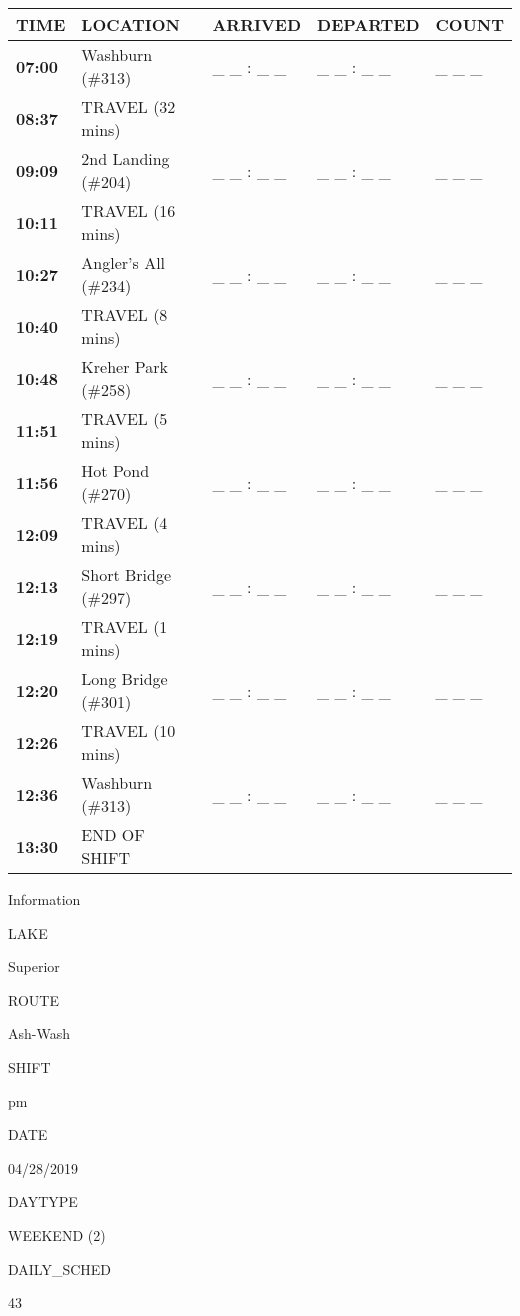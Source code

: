 \documentclass[]{article}
\begin{document}
\begin{tabular}{>{\bfseries}lllll}
\toprule
\textbf{TIME} & \textbf{LOCATION} & \textbf{ARRIVED} & \textbf{DEPARTED} & \textbf{COUNT}\\
\midrule
07:00 & Washburn (\#313) & \_ \_ : \_ \_ & \_ \_ : \_ \_ & \_ \_ \_\\
08:37 & TRAVEL (32 mins) &  &  & \\
09:09 & 2nd Landing (\#204) & \_ \_ : \_ \_ & \_ \_ : \_ \_ & \_ \_ \_\\
10:11 & TRAVEL (16 mins) &  &  & \\
10:27 & Angler's All (\#234) & \_ \_ : \_ \_ & \_ \_ : \_ \_ & \_ \_ \_\\
10:40 & TRAVEL (8 mins) &  &  & \\
10:48 & Kreher Park (\#258) & \_ \_ : \_ \_ & \_ \_ : \_ \_ & \_ \_ \_\\
11:51 & TRAVEL (5 mins) &  &  & \\
11:56 & Hot Pond (\#270) & \_ \_ : \_ \_ & \_ \_ : \_ \_ & \_ \_ \_\\
12:09 & TRAVEL (4 mins) &  &  & \\
12:13 & Short Bridge (\#297) & \_ \_ : \_ \_ & \_ \_ : \_ \_ & \_ \_ \_\\
12:19 & TRAVEL (1 mins) &  &  & \\
12:20 & Long Bridge (\#301) & \_ \_ : \_ \_ & \_ \_ : \_ \_ & \_ \_ \_\\
12:26 & TRAVEL (10 mins) &  &  & \\
12:36 & Washburn (\#313) & \_ \_ : \_ \_ & \_ \_ : \_ \_ & \_ \_ \_\\
13:30 & END OF SHIFT &  &  & \\
\bottomrule
\end{tabular}\newpage

Information

LAKE

Superior

ROUTE

Ash-Wash

SHIFT

pm

DATE

04/28/2019

DAYTYPE

WEEKEND (2)

DAILY\_SCHED

43

\vspace{24pt}
\end{document}
